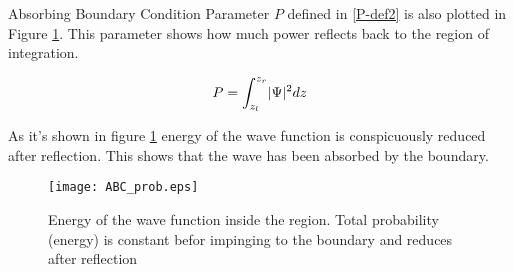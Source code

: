 \begin{homeworkProblem}
\begin{homeworkSection}{Absorbing Boundary Condition}
Parameter $P$  defined in \eqref{P-def2} is also plotted in Figure \ref{fig:ABC_prob}. This parameter shows how much power reflects back to the region of integration.

\begin{equation}\label{P-def2}
P=\int_{z_l}^{z_r}\lvert\Psi\rvert^2dz
\end{equation}

As it's shown in figure \ref{fig:ABC_prob} energy of the wave function is conspicuously reduced after reflection. This shows that the wave has been absorbed by the boundary.
\begin{figure}[!h]
\centering
\texttt{[image: ABC\_prob.eps]}
\caption{\small  Energy of the wave function inside the region. Total probability (energy) is constant befor impinging to the boundary and reduces after reflection }
\label{fig:ABC_prob}
\end{figure} 

\end{homeworkSection}
\end{homeworkProblem}